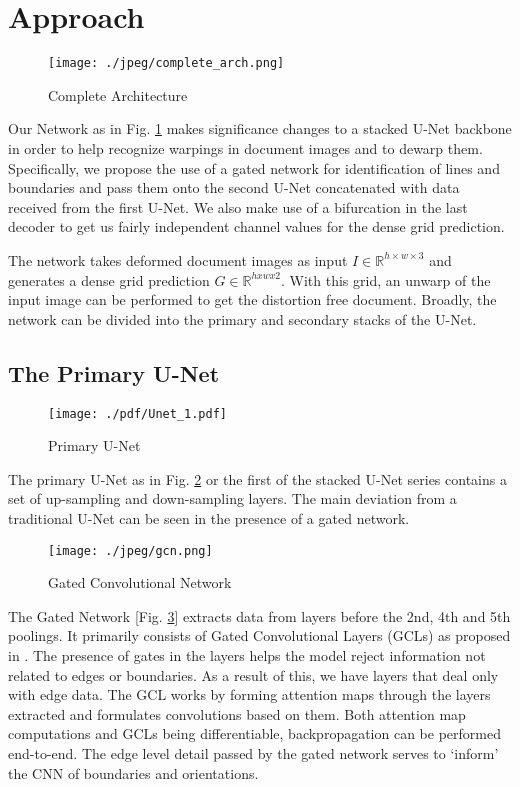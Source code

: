 \documentclass[a4paper,conference]{IEEEtran}
\begin{document}
	\section{Approach}
	
	\begin{figure}
		\centering
		{	
			\texttt{[image: ./jpeg/complete\_arch.png]}
		}
		\caption{Complete Architecture}
		\label{fig:arch}
	\end{figure}
	
	Our Network as in Fig. \ref{fig:arch} makes significance changes to a stacked U-Net backbone in order to help recognize warpings in document images and to dewarp them. Specifically,  we propose the use of a gated network for identification of lines and boundaries and pass them onto the second U-Net concatenated with data received from the first U-Net. We also make use of a bifurcation in the last decoder to get us fairly independent channel values for the dense grid prediction.
	
	
	The network takes deformed document images as input $I \in \mathbb{R} ^{h\times w\times3}$ and generates a dense grid prediction $G \in \mathbb{R} ^{hxwx2}$. With this grid, an unwarp of the input image can be performed to get the distortion free document. Broadly, the network can be divided into the primary and secondary stacks of the U-Net.
	
	\subsection{The Primary U-Net}
	
	\begin{figure}[!t]
		\texttt{[image: ./pdf/Unet\_1.pdf]}
		\caption{Primary U-Net}
		
		\label{fig:arch1}
	\end{figure}
	
	The primary U-Net as in Fig. \ref{fig:arch1} or the first of the stacked U-Net series contains a set of up-sampling and down-sampling layers. The main deviation from a traditional U-Net can be seen in the presence of a gated network.
	\\
	
	
	\begin{figure}
		\centering
		{	
			\texttt{[image: ./jpeg/gcn.png]}
		}
		\caption{Gated Convolutional Network}
		\label{fig:arch3}
	\end{figure}
	The Gated Network [Fig. \ref{fig:arch3}] extracts data from layers before the 2nd, 4th and 5th poolings. It primarily consists of Gated Convolutional Layers (GCLs) as proposed in \cite{GSCNN}. The presence of gates in the layers helps the model reject information not related to edges or boundaries. As a result of this, we have layers that deal only with edge data. The GCL works by forming attention maps through the layers extracted and formulates convolutions based on them. Both attention map computations and GCLs being differentiable, backpropagation can be performed end-to-end.
	The edge level detail passed by the gated network serves to `inform' the CNN of boundaries and orientations.
	
\end{document}
